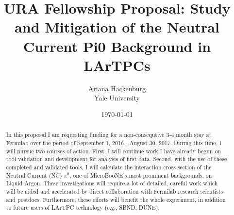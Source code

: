 \documentclass[12pt]{article}
\begin{document}



\title{ URA Fellowship Proposal: Study and Mitigation of the Neutral Current Pi0 Background in LArTPCs }
\author{Ariana Hackenburg  \\Yale University \\} 
\date{\today}
\maketitle

\renewcommand{\abstractname}{Proposal Summary}
\begin{abstract}
In this proposal I am requesting funding for a non-consequtive 3-4 month stay at Fermilab over the period of September 1, 2016 - August 30, 2017.  During this time, I will pursue two courses of action.  First, I will continue work I have already begun on tool validation and development for analysis of first data.  Second, with the use of these completed and validated tools, I will calculate the interaction cross section of the Neutral Current (NC) $\pi^0$, one of MicroBooNE's most prominent backgrounds, on Liquid Argon.  These investigations will require a lot of detailed, careful work which will be aided and accelerated by direct collaboration with Fermilab research scientists and postdocs. Furthermore, these efforts will benefit the whole experiment, in addition to future users of LArTPC technology (e.g., SBND, DUNE). 

\end{abstract}
\end{document}
